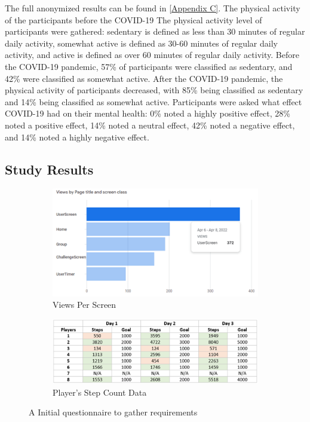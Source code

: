 \documentclass{l4proj}
\begin{document}
The full anonymized results can be found in \ref{Appendix C}. The physical activity of the participants before the COVID-19 The physical activity level of participants were gathered: sedentary is defined as less than 30 minutes of regular daily activity, somewhat active is defined as 30-60 minutes of regular daily activity, and active is defined as over 60 minutes of regular daily activity. Before the COVID-19 pandemic, 57\% of participants were classified as sedentary, and 42\% were classified as somewhat active. After the COVID-19 pandemic, the physical activity of participants decreased, with 85\% being classified as sedentary and 14\% being classified as somewhat active. Participants were asked what effect COVID-19 had on their mental health: 0\% noted a highly positive effect, 28\% noted a positive effect, 14\% noted a neutral effect, 42\% noted a negative effect, and 14\% noted a highly negative effect. 

\subsection{Study Results} 


\begin{figure}
\centering
\begin{subfigure}{.50\textwidth}
  \centering
  \includegraphics[width=\linewidth]{dissertation/images/20.png}
  \caption{Views Per Screen}
  \label{fig:sub1}
\end{subfigure}%
\begin{subfigure}{.5\textwidth}
  \centering
  \includegraphics[width=\linewidth]{dissertation/images/21.png}
  \caption{Player's Step Count Data}
  \label{fig:sub2}
\end{subfigure}
\caption{A Initial questionnaire to gather requirements}
\label{fig:test}
\end{figure}
 
\end{document}
